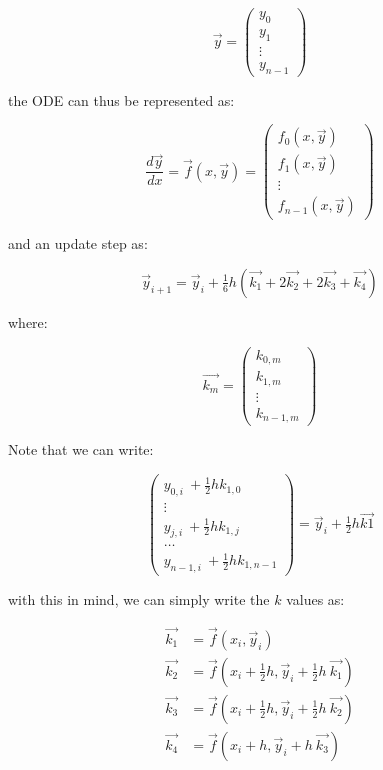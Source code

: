 \documentclass[11pt]{article}
\begin{document}
\[
\vec{y} = \begin{pmatrix} y_0 \\ y_1 \\ \vdots \\ y_{n-1} \end{pmatrix}
\]

the ODE can thus be represented as:

\[
\frac{d \vec{y}}{dx} = \vec{f}(x, \vec{y}) = \begin{pmatrix} f_0 (x, \vec{y}) \\ f_1 (x, \vec{y}) \\ \vdots \\ f_{n-1} (x, \vec{y}) \end{pmatrix}
\]

and an update step as:

\[
\vec{y}_{i+1} = \vec{y}_i + \tfrac{1}{6} h (\vec{k_1} + 2 \vec{k_2} + 2 \vec{k_3} + \vec{k_4})
\]

where:

\[
\vec{k_m} = \begin{pmatrix} k_{0, m} \\ k_{1, m} \\ \vdots \\ k_{n-1, m} \end{pmatrix}
\]

Note that we can write:

\[
\begin{pmatrix}
y_{0, i}~ + \tfrac{1}{2} h k_{1, 0} \\\vdots \\y_{j, i}~ + \tfrac{1}{2} h k_{1, j} \\ \dots \\ y_{n-1, i}~ + \tfrac{1}{2} h k_{1, n-1}
\end{pmatrix}
= \vec{y}_i + \tfrac{1}{2} h \vec{k1}
\]

with this in mind, we can simply write the \(k\) values as:

\begin{align*}
\vec{k_1} &= \vec{f}(x_i, \vec{y}_i)\\
\vec{k_2} &= \vec{f}\left(x_i + \tfrac{1}{2} h, \vec{y}_i + \tfrac{1}{2} h ~ \vec{k_1} \right)\\
\vec{k_3} &= \vec{f}\left(x_i + \tfrac{1}{2} h, \vec{y}_i + \tfrac{1}{2} h ~ \vec{k_2} \right)\\
\vec{k_4} & = \vec{f}\left(x_i + h, \vec{y}_i + h ~ \vec{k_3} \right)
\end{align*}
\end{document}
